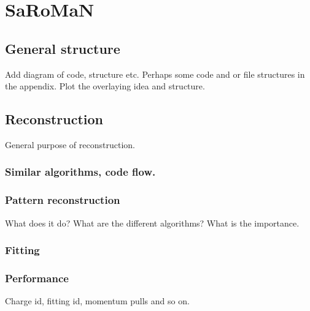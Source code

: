 \chapter{SaRoMaN}
\label{c:software}

\section{General structure}
Add diagram of code, structure etc. Perhaps some code and or file structures in the appendix.
Plot the overlaying idea and structure.



\section{Reconstruction}
General purpose of reconstruction.

\subsection{Similar algorithms, code flow.}

\subsection{Pattern reconstruction}
What does it do? What are the different algorithms? What is the importance.

\subsection{Fitting}

\subsection{Performance}
Charge id, fitting id, momentum pulls and so on.